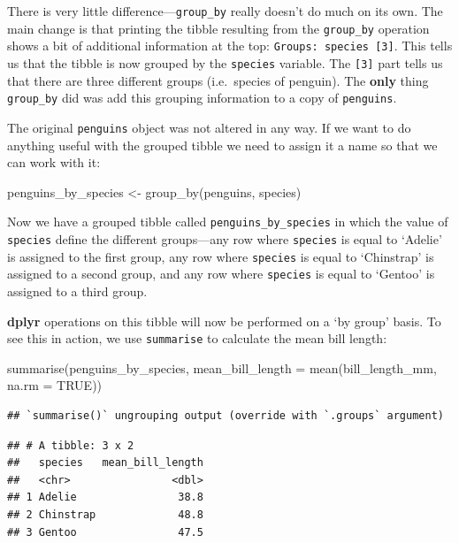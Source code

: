 \documentclass[
]{book}
\newenvironment{Shaded}{\begin{snugshade}}{\end{snugshade}}
\newcommand{\AttributeTok}[1]{\textcolor[rgb]{0.77,0.63,0.00}{#1}}
\newcommand{\ConstantTok}[1]{\textcolor[rgb]{0.00,0.00,0.00}{#1}}
\newcommand{\FunctionTok}[1]{\textcolor[rgb]{0.00,0.00,0.00}{#1}}
\newcommand{\NormalTok}[1]{#1}
\newcommand{\OtherTok}[1]{\textcolor[rgb]{0.56,0.35,0.01}{#1}}
\begin{document}
There is very little difference---\texttt{group\_by} really doesn't do much on its own. The main change is that printing the tibble resulting from the \texttt{group\_by} operation shows a bit of additional information at the top: \texttt{Groups:\ species\ {[}3{]}}. This tells us that the tibble is now grouped by the \texttt{species} variable. The \texttt{{[}3{]}} part tells us that there are three different groups (i.e.~species of penguin). The \textbf{only} thing \texttt{group\_by} did was add this grouping information to a copy of \texttt{penguins}.

The original \texttt{penguins} object was not altered in any way. If we want to do anything useful with the grouped tibble we need to assign it a name so that we can work with it:

\begin{Shaded}
\begin{Highlighting}[]
\NormalTok{penguins\_by\_species }\OtherTok{\textless{}{-}} \FunctionTok{group\_by}\NormalTok{(penguins, species)}
\end{Highlighting}
\end{Shaded}

Now we have a grouped tibble called \texttt{penguins\_by\_species} in which the value of \texttt{species} define the different groups---any row where \texttt{species} is equal to `Adelie' is assigned to the first group, any row where \texttt{species} is equal to `Chinstrap' is assigned to a second group, and any row where \texttt{species} is equal to `Gentoo' is assigned to a third group.

\textbf{dplyr} operations on this tibble will now be performed on a `by group' basis. To see this in action, we use \texttt{summarise} to calculate the mean bill length:

\begin{Shaded}
\begin{Highlighting}[]
\FunctionTok{summarise}\NormalTok{(penguins\_by\_species, }
          \AttributeTok{mean\_bill\_length =} \FunctionTok{mean}\NormalTok{(bill\_length\_mm, }\AttributeTok{na.rm =} \ConstantTok{TRUE}\NormalTok{))}
\end{Highlighting}
\end{Shaded}

\begin{verbatim}
## `summarise()` ungrouping output (override with `.groups` argument)
\end{verbatim}

\begin{verbatim}
## # A tibble: 3 x 2
##   species   mean_bill_length
##   <chr>                <dbl>
## 1 Adelie                38.8
## 2 Chinstrap             48.8
## 3 Gentoo                47.5
\end{verbatim}
\end{document}
